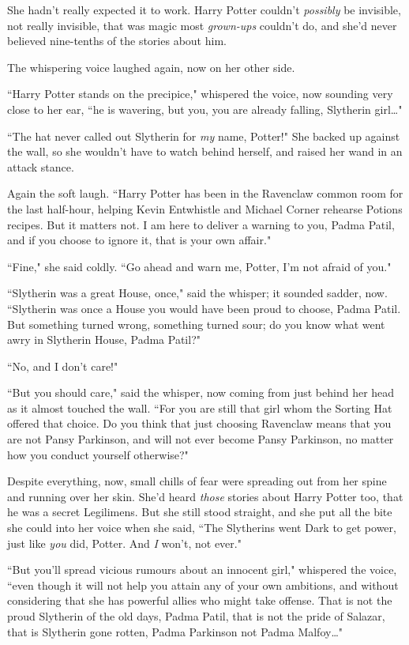She hadn't really expected it to work. Harry Potter couldn't \emph{possibly} be invisible, not really invisible, that was magic most \emph{grown-ups} couldn't do, and she'd never believed nine-tenths of the stories about him.

The whispering voice laughed again, now on her other side.

``Harry Potter stands on the precipice," whispered the voice, now sounding very close to her ear, ``he is wavering, but you, you are already falling, Slytherin girl{\ldots}"

``The hat never called out Slytherin for \emph{my} name, Potter!" She backed up against the wall, so she wouldn't have to watch behind herself, and raised her wand in an attack stance.

Again the soft laugh. ``Harry Potter has been in the Ravenclaw common room for the last half-hour, helping Kevin Entwhistle and Michael Corner rehearse Potions recipes. But it matters not. I am here to deliver a warning to you, Padma Patil, and if you choose to ignore it, that is your own affair."

``Fine," she said coldly. ``Go ahead and warn me, Potter, I'm not afraid of you."

``Slytherin was a great House, once," said the whisper; it sounded sadder, now. ``Slytherin was once a House you would have been proud to choose, Padma Patil. But something turned wrong, something turned sour; do you know what went awry in Slytherin House, Padma Patil?"

``No, and I don't care!"

``But you should care," said the whisper, now coming from just behind her head as it almost touched the wall. ``For you are still that girl whom the Sorting Hat offered that choice. Do you think that just choosing Ravenclaw means that you are not Pansy Parkinson, and will not ever become Pansy Parkinson, no matter how you conduct yourself otherwise?"

Despite everything, now, small chills of fear were spreading out from her spine and running over her skin. She'd heard \emph{those} stories about Harry Potter too, that he was a secret Legilimens. But she still stood straight, and she put all the bite she could into her voice when she said, ``The Slytherins went Dark to get power, just like \emph{you} did, Potter. And \emph{I} won't, not ever."

``But you'll spread vicious rumours about an innocent girl," whispered the voice, ``even though it will not help you attain any of your own ambitions, and without considering that she has powerful allies who might take offense. That is not the proud Slytherin of the old days, Padma Patil, that is not the pride of Salazar, that is Slytherin gone rotten, Padma Parkinson not Padma Malfoy{\ldots}"

